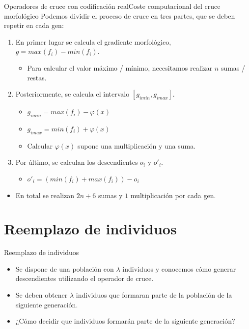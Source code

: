 \documentclass[10pt]{beamer}
\begin{document}
\begin{frame}{Operadores de cruce con codificación real}{Coste computacional del cruce morfológico}
Podemos dividir el proceso de cruce en tres partes, que se deben repetir en cada gen:
	\begin{enumerate}
		\item En primer lugar se calcula el gradiente morfológico, $g = max(f_{i}) - min(f_{i})$.
			\begin{itemize}
				\item Para calcular el valor máximo / mínimo, necesitamos realizar $n$ sumas / restas.
			\end{itemize}
		\item Posteriormente, se calcula el intervalo $[g_{imin}, g_{imax}]$.
			\begin{itemize}
				\item $g_{imin} = max(f_{i}) - \varphi(x)$
				\item $g_{imax} = min(f_{i}) + \varphi(x)$
				\item Calcular $\varphi(x)$ supone una multiplicación y una suma.
			\end{itemize}
			
		\item Por último, se calculan los descendientes $o_{i}$ y $o'_{i}$.
			\begin{itemize}
				\item $o'_{i} = (min(f_{i}) + max(f_{i})) - o_{i}$
			\end{itemize}
	\end{enumerate}
	
	\begin{itemize}
		\item En total se realizan $2n + 6$ sumas y $1$ multiplicación por cada gen.
	\end{itemize}
\end{frame}

\section{Reemplazo de individuos}
\begin{frame}{Reemplazo de individuos}
	\begin{itemize}
		\item Se dispone de una población con $\lambda$ individuos y conocemos cómo generar descendientes utilizando el operador de cruce.
		\item Se deben obtener $\lambda$ individuos que formaran parte de la población de la siguiente generación.
		\item ¿Cómo decidir que individuos formarán parte de la siguiente generación?
	\end{itemize}
\end{frame}
\end{document}
